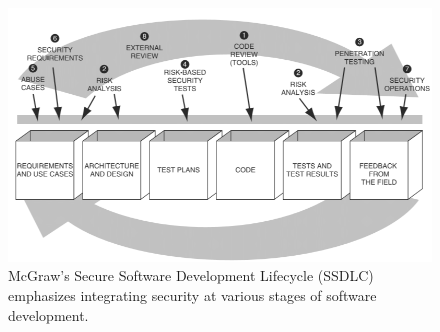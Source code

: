 \documentclass[9pt]{extarticle}
\begin{document}
\begin{figure}[h]
    \begin{center}
        \includegraphics[width=0.5\linewidth]{images/McGraws-Secure-Software-Development-Life-Cycle-Process.png}
    \caption{McGraw's Secure Software Development Lifecycle (SSDLC) emphasizes integrating security at various stages of software development.}
    \end{center}
\end{figure}
\end{document}
